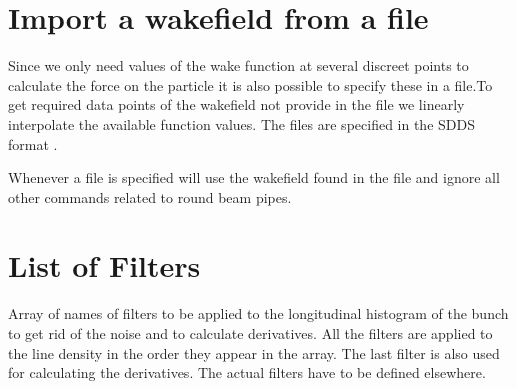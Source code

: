 \section{Import a wakefield from a file}
\label{sec:WFNAME}

Since we only need values of the wake function at several discreet points to calculate the force on the particle it is also possible to specify these in a file.To get required data points of the wakefield not provide in the file we linearly interpolate the available function values. The files are specified in the SDDS format \cite{bib:borland1995,bib:borland1998}.

Whenever a file is specified \opal will use the wakefield found in the file and ignore all other commands related to round beam pipes.

\section{List of Filters}
\label{sec:FILTER}
  Array of names of filters to be applied to the longitudinal histogram of the bunch to get rid of the noise and to calculate derivatives. All the filters are applied to the line density in the order they appear in the array. The last filter is also used for calculating the derivatives. The actual filters have to be defined elsewhere.


